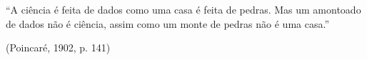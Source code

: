 
\begin{epigrafe}
``A ciência é feita de dados como uma casa é feita de pedras. Mas um amontoado
de dados não é ciência, assim como um monte de pedras não é uma casa.''

\vspace{\idplinhasimp}
(Poincaré, 1902, p. 141)
\end{epigrafe}
